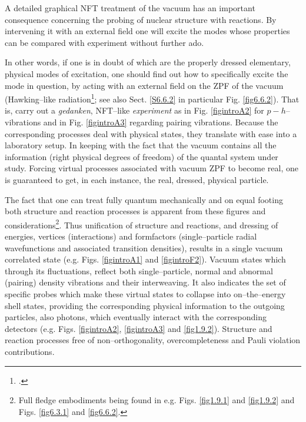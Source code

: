 A detailed graphical NFT treatment of the vacuum has an important consequence concerning the probing of nuclear structure with reactions. By intervening it with an external field one will excite the modes whose properties can be  compared with experiment without further ado. 

In other words, if one is in doubt of which are the properly dressed elementary, physical modes of excitation, one should find out how to specifically excite the  mode in question, by acting with an external field on the ZPF of the vacuum (Hawking--like radiation\footnote{\cite{Barranco:17b}.}; see also Sect. \ref{S6.6.2} in particular Fig. \ref{fig6.6.2}). That is,  carry out a \textit{gedanken}, NFT--like \textit{experiment} as in Fig. \ref{figintroA2} for $p-h$--vibrations and in Fig. \ref{figintroA3} regarding pairing vibrations. Because the corresponding processes deal  with physical states, they translate with ease into a laboratory setup. In keeping with the fact that the vacuum contains all the information (right physical degrees of freedom) of the quantal system under study. Forcing virtual processes associated  with vacuum ZPF to become real, one is guaranteed to get, in each instance, the real, dressed, physical particle. 

The fact that one can treat fully quantum mechanically and on equal footing both structure and reaction processes is apparent from these figures and considerations\footnote{Full fledge embodiments being found in e.g. Figs. \ref{fig1.9.1} and \ref{fig1.9.2} and Figs. \ref{fig6.3.1} and \ref{fig6.6.2}.}. Thus unification of structure and reactions, and dressing of energies, vertices (interactions) and formfactors (single--particle radial wavefunctions and associated transition densities), results in a single vacuum correlated state (e.g. Figs. \ref{figintroA1} and \ref{figintroF2}). Vacuum states which through its fluctuations, reflect both single--particle, normal and abnormal (pairing) density vibrations and their interweaving.  It also indicates the  set of specific probes which make  these virtual states to collapse into on--the--energy shell states, providing the corresponding physical information to the   outgoing particles, also photons, which eventually interact with the corresponding detectors (e.g. Figs. \ref{figintroA2}, \ref{figintroA3} and \ref{fig1.9.2}). Structure and reaction processes free of non--orthogonality, overcompleteness and Pauli violation contributions.


